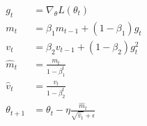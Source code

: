 \documentclass[a4paper, 12pt]{article}
\begin{document}
\begin{align*}
g_t &= \nabla_\theta L(\theta_t) \\
m_t &= \beta_1 m_{t-1} + (1 - \beta_1) g_t  \\
v_t &= \beta_2 v_{t-1} + (1 - \beta_2) g_t^2  \\
\hat{m}_t &= \frac{m_t}{1 - \beta_1^t}  \\
\hat{v}_t &= \frac{v_t}{1 - \beta_2^t}  \\
\theta_{t+1} &= \theta_t - \eta \frac{\hat{m}_t}{\sqrt{\hat{v}_t} + \epsilon} \\
\end{align*}



\vspace{10mm}


\end{document}
